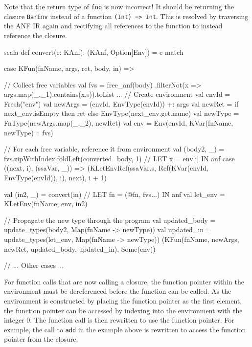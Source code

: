 Note that the return type of \texttt{foo} is now incorrect! It should be returning the closure
\texttt{BarEnv} instead of a function \texttt{(Int) => Int}. This is resolved
by traversing the ANF IR again and rectifying all references to the function to instead reference
the closure.

\begin{code}{scala}
    def convert(e: KAnf): (KAnf, Option[Env]) = e match {
        case KFun(fnName, args, ret, body, in) => {
            // Collect free variables
            val fvs = free_anf(body)
                .filterNot(x => args.map(_._1).contains(x.s)).toList
            ...
            // Create environment
            val envId = Fresh("env")
            val newArgs = (envId, EnvType(envId)) +: args
            val newRet = if next_env.isEmpty then ret else EnvType(next_env.get.name)
            val newType = FnType(newArgs.map(_._2), newRet)
            val env = Env(envId, KVar(fnName, newType) :: fvs)

            // For each free variable, reference it from environment
            val (body2, _) = fvs.zipWithIndex.foldLeft(converted_body, 1) {
                    // LET x = env[i] IN anf
                    case ((next, i), (ssaVar, _)) =>
                        (KLetEnvRef(ssaVar.s, Ref(KVar(envId, EnvType(envId)), i), next), i + 1)
                }

            val (in2, _) = convert(in)
            // LET fn = (@fn, fvs...) IN anf
            val let_env = KLetEnv(fnName, env, in2)

            // Propagate the new type through the program
            val updated_body = update_types(body2, Map(fnName -> newType))
            val updated_in = update_types(let_env, Map(fnName -> newType))
            (KFun(fnName, newArgs, newRet, updated_body, updated_in), Some(env))
        }
    // ... Other cases ...
    }
\end{code}

For function calls that are now calling a closure, the function pointer within the environment must
be dereferenced before the function can be called. As the environment is constructed by placing the
function pointer as the first element, the function pointer can be accessed by indexing into the
environment with the integer 0. The function call is then rewritten to use the function pointer.
For example, the call to \texttt{add} in the example above is rewritten to access the function
pointer from the closure:

